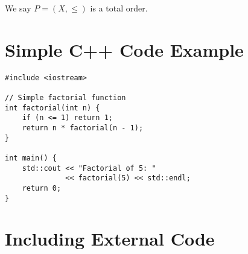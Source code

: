 \documentclass[12pt]{article}
\begin{document}

We say $P = (X, \le)$ is a total order.


\section*{Simple C++ Code Example}

\begin{lstlisting}[caption={Basic C++ Code},label=lst:basic]
#include <iostream>

// Simple factorial function
int factorial(int n) {
    if (n <= 1) return 1;
    return n * factorial(n - 1);
}

int main() {
    std::cout << "Factorial of 5: " 
              << factorial(5) << std::endl;
    return 0;
}
\end{lstlisting}

\section*{Including External Code}





\end{document}
